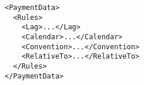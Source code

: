 \begin{listing}[H]
\begin{verbatim}
<PaymentData>
  <Rules>
    <Lag>...</Lag>
    <Calendar>...</Calendar>
    <Convention>...</Convention>
    <RelativeTo>...</RelativeTo>
  </Rules>
</PaymentData>
\end{verbatim}
\caption{Rules based \lstinline!PaymentData!}
\label{lst:rules_payment_data}
\end{listing}

